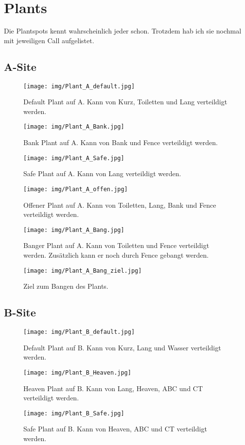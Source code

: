 \section{Plants}
Die Plantspots kennt wahrscheinlich jeder schon. Trotzdem hab ich sie nochmal mit jeweiligen Call aufgelistet.
\subsection{A-Site}
\begin{figure}
   \centering
   \texttt{[image: img/Plant\_A\_default.jpg]}
   \caption{Default Plant auf A. Kann von Kurz, Toiletten und Lang verteildigt werden.}
   \label{fig:plant_a_default}
\end{figure}
\begin{figure}
   \centering
   \texttt{[image: img/Plant\_A\_Bank.jpg]}
   \caption{Bank Plant auf A. Kann von Bank und Fence verteildigt werden.}
   \label{fig:plant_a_Bank}
\end{figure}
\begin{figure}
   \centering
   \texttt{[image: img/Plant\_A\_Safe.jpg]}
   \caption{Safe Plant auf A. Kann von Lang verteildigt werden.}
   \label{fig:plant_a_safe}
\end{figure}
\begin{figure}
   \centering
   \texttt{[image: img/Plant\_A\_offen.jpg]}
   \caption{Offener Plant auf A. Kann von Toiletten, Lang, Bank und Fence verteildigt werden.}
   \label{fig:plant_a_offen}
\end{figure}
\begin{figure}
   \centering
   \texttt{[image: img/Plant\_A\_Bang.jpg]}
   \caption{Banger Plant auf A. Kann von Toiletten und Fence verteildigt werden. Zusätzlich kann er noch durch Fence gebangt werden.}
   \label{fig:plant_a_bang}
\end{figure}
\begin{figure}
   \centering
   \texttt{[image: img/Plant\_A\_Bang\_ziel.jpg]}
   \caption{Ziel zum Bangen des Plants.}
\end{figure}
\FloatBarrier
\subsection{B-Site}
\begin{figure}
   \centering
   \texttt{[image: img/Plant\_B\_default.jpg]}
   \caption{Default Plant auf B. Kann von Kurz, Lang und Wasser verteildigt werden.}
   \label{fig:plant_b_default}
\end{figure}
\begin{figure}
   \centering
   \texttt{[image: img/Plant\_B\_Heaven.jpg]}
   \caption{Heaven Plant auf B. Kann von Lang, Heaven, ABC und CT verteildigt werden.}
   \label{fig:plant_b_heaven}
\end{figure}
\begin{figure}
   \centering
   \texttt{[image: img/Plant\_B\_Safe.jpg]}
   \caption{Safe Plant auf B. Kann von Heaven, ABC und CT verteildigt werden.}
   \label{fig:plant_a_default}
\end{figure}


